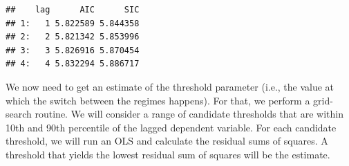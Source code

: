 \documentclass[
  12pt,
  oneside]{book}
\newenvironment{Shaded}{\begin{snugshade}}{\end{snugshade}}
\newcommand{\AttributeTok}[1]{\textcolor[rgb]{0.77,0.63,0.00}{#1}}
\newcommand{\ConstantTok}[1]{\textcolor[rgb]{0.00,0.00,0.00}{#1}}
\newcommand{\ControlFlowTok}[1]{\textcolor[rgb]{0.13,0.29,0.53}{\textbf{#1}}}
\newcommand{\DecValTok}[1]{\textcolor[rgb]{0.00,0.00,0.81}{#1}}
\newcommand{\FunctionTok}[1]{\textcolor[rgb]{0.00,0.00,0.00}{#1}}
\newcommand{\NormalTok}[1]{#1}
\newcommand{\OtherTok}[1]{\textcolor[rgb]{0.56,0.35,0.01}{#1}}
\newcommand{\SpecialCharTok}[1]{\textcolor[rgb]{0.00,0.00,0.00}{#1}}
\newcommand{\StringTok}[1]{\textcolor[rgb]{0.31,0.60,0.02}{#1}}
\begin{document}
\begin{verbatim}
##    lag      AIC      SIC
## 1:   1 5.822589 5.844358
## 2:   2 5.821342 5.853996
## 3:   3 5.826916 5.870454
## 4:   4 5.832294 5.886717
\end{verbatim}

We now need to get an estimate of the threshold parameter (i.e., the value at which the switch between the regimes happens). For that, we perform a grid-search routine. We will consider a range of candidate thresholds that are within 10th and 90th percentile of the lagged dependent variable. For each candidate threshold, we will run an OLS and calculate the residual sums of squares. A threshold that yields the lowest residual sum of squares will be the estimate.

\begin{Shaded}
\end{Shaded}
\end{document}
